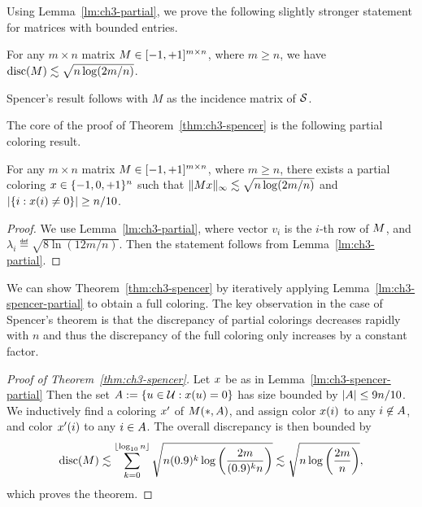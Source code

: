 Using Lemma~\ref{lm:ch3-partial}, we prove the following slightly stronger statement for matrices with bounded entries.
\begin{theorem}\label{thm:ch3-spencer}
  For any \(m \times n\) matrix \(M \in [-1, +1]^{m\times n}\),
  where $m \ge n$, we have
  \(\operatorname{disc}(M) \lesssim \sqrt{n\log(2m/n)}\). %
\end{theorem}
Spencer's result follows with $M$ as the incidence matrix of \(\mathcal{S}\).

The core of the proof of Theorem~\ref{thm:ch3-spencer} is the
following partial coloring result.
\begin{lemma}\label{lm:ch3-spencer-partial}
For any \(m \times n\) matrix \(M \in [-1, +1]^{m\times n}\),
  where $m \ge n$, there exists a partial coloring
  \(x \in \{-1,0,+1\}^n\) such that
  \(\|M x\|_\infty \lesssim \sqrt{n\log(2m/n)}\) and
  \(|\{i: x(i) \neq 0\}| \ge n/10\).
\end{lemma}
\begin{proof}
  We use Lemma~\ref{lm:ch3-partial}, where vector $v_i$ is the $i$-th
  row of $M$, and
  \(
  \lambda_i \eqdef \sqrt{8\ln(12m/n)}.
  \)
  Then the statement follows from Lemma~\ref{lm:ch3-partial}.
\end{proof}

We can show
Theorem~\ref{thm:ch3-spencer} by iteratively applying
Lemma~\ref{lm:ch3-spencer-partial}  to obtain
a full coloring. The key observation in the case of Spencer's theorem
is that the discrepancy of partial colorings decreases rapidly
with \(n\) and thus the discrepancy of the full coloring only increases by a constant factor.

\begin{proof}[Proof of Theorem~\ref{thm:ch3-spencer}]
  Let \(x\) be as in Lemma~\ref{lm:ch3-spencer-partial}
  Then the set \(A :=
  \{u \in \mathcal{U}: x(u) = 0\}\) has size bounded by \(|A|
  \le 9n/10\). We inductively find a coloring \(x'\) of
  \(M(*,A)\), and assign color \(x(i)\) to any \(i \not \in
  A\), and color \(x'(i)\) to any \(i \in A\). 
  The overall discrepancy is then
  bounded by
  \[
    \operatorname{disc}(M) \lesssim
    \sum_{k = 0}^{\lfloor\log_{10}n\rfloor} \sqrt{n (0.9)^k\log\left(\frac{2m}{(0.9)^kn}\right)}
    \lesssim \sqrt{n\log\left(\frac{2m}{n}\right)},
  \]
  which proves the theorem. 
\end{proof}


